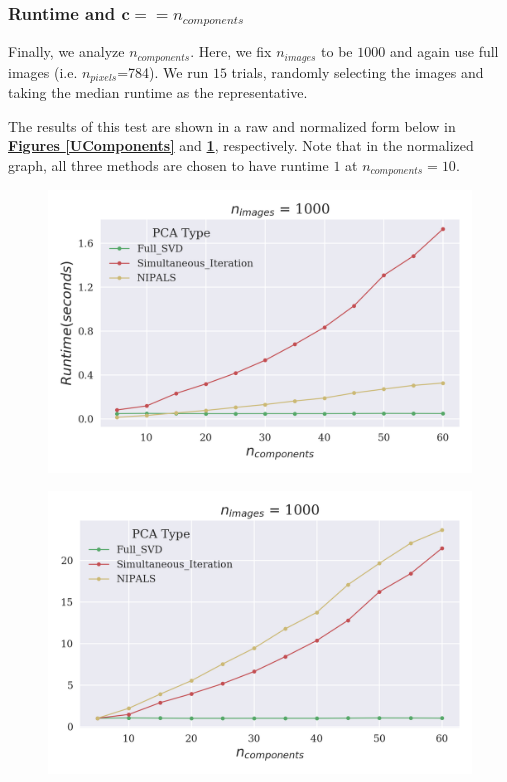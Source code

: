 \documentclass[12pt]{article}
\begin{document}
\subsubsection{Runtime and $\textbf{c} == n_{components}$}\label{5.1.4}

Finally, we analyze $n_{components}$. Here, we fix $n_{images}$ to be $1000$ and again use full images (i.e. $n_{pixels}$=784). We run $15$ trials, randomly selecting the images and taking the median runtime as the representative. 

The results of this test are shown in a raw and normalized form below in \textbf{\hyperref[UPixels]{Figures \ref*{UComponents}}} and \textbf{\hyperref[NPixels]{\ref*{NComponents}}}, respectively. Note that in the normalized graph, all three methods are chosen to have runtime $1$ at $n_{components} = 10$.

\begin{figure}[H]
\centering
\begin{minipage}{.45\textwidth}
  \centering
  \includegraphics[width=\linewidth]{UComponents.png}
  \label{UComponents}
\end{minipage}%
\quad
\begin{minipage}{.45\textwidth}
  \centering
  \includegraphics[width=\linewidth]{NComponents.png}
  \label{NComponents}
\end{minipage}
\end{figure}
\end{document}
